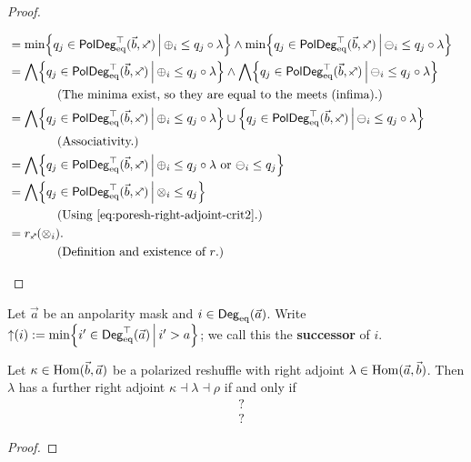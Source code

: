 \documentclass[a4paper]{memoir}
\begin{document}
\begin{proof}
\begin{enumerate}
\begin{itemize}
\begin{align*}
				&= \min \set{q_j \in \poldegeqtop(\vec b, \ypolar)}{\pospol_i \leq q_j \circ \lambda} \wedge \min \set{q_j \in \poldegeqtop(\vec b, \ypolar)}{\negpol_i \leq q_j \circ \lambda} \\
				&= \bigwedge \set{q_j \in \poldegeqtop(\vec b, \ypolar)}{\pospol_i \leq q_j \circ \lambda} \wedge \bigwedge \set{q_j \in \poldegeqtop(\vec b, \ypolar)}{\negpol_i \leq q_j \circ \lambda} \\
				&\qquad \qquad \text{(The minima exist, so they are equal to the meets (infima).)} \\
				&= \bigwedge \set{q_j \in \poldegeqtop(\vec b, \ypolar)}{\pospol_i \leq q_j \circ \lambda} \cup \set{q_j \in \poldegeqtop(\vec b, \ypolar)}{\negpol_i \leq q_j \circ \lambda} \\
				&\qquad \qquad \text{(Associativity.)} \\
				&= \bigwedge \set{q_j \in \poldegeqtop(\vec b, \ypolar)}{\pospol_i \leq q_j \circ \lambda \text{ or } \negpol_i \leq q_j} \\
				&= \bigwedge \set{q_j \in \poldegeqtop(\vec b, \ypolar)}{\mixpol_i \leq q_j} \\
				&\qquad \qquad \text{(Using \cref{eq:poresh-right-adjoint-crit2}.)} \\
				&= r_\ypolar(\mixpol_i). \\
				&\qquad \qquad \text{(Definition and existence of $r$.)} &\qedhere
			\end{align*}
		\end{itemize}
	\end{enumerate}
\end{proof}

\begin{definition} \label{def:suc-degree}
	Let $\vec a$ be an anpolarity mask and $i \in {\mathsf{Deg}_{\mathrm{eq}}}(\vec a)$.
	Write ${\uparrow}(i) := \min \mathopen{}\left\{ i' \in {\mathsf{Deg}_{\mathrm{eq}}^\top}(\vec a) \,\middle|\, i' > a \right\}\mathclose{}$; we call this the \textbf{successor} of $i$.
\end{definition}

\begin{theorem} \label{thm:poresh-withrr}
	Let $\kappa \in {\mathrm{Hom}}(\vec b, \vec a)$ be a polarized reshuffle with right adjoint $\lambda \in {\mathrm{Hom}}(\vec a, \vec b)$.
	Then $\lambda$ has a further right adjoint $\kappa \dashv \lambda \dashv \rho$ if and only if
	\begin{align}
		&\text{?} \label{eq:poresh-withrr-crit1} \\
		&\text{?} \label{eq:poresh-withrr-crit2}
	\end{align}
\end{theorem}
\begin{proof}
\end{proof}
\end{document}
